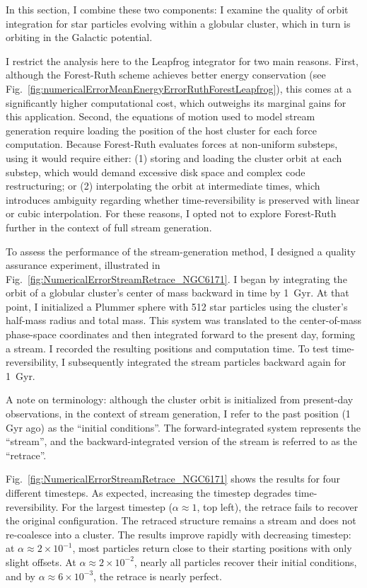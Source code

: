         In this section, I combine these two components: I examine the quality of orbit integration for star particles evolving within a globular cluster, which in turn is orbiting in the Galactic potential.

        I restrict the analysis here to the Leapfrog integrator for two main reasons. First, although the Forest-Ruth scheme achieves better energy conservation (see Fig.~\ref{fig:numericalErrorMeanEnergyErrorRuthForestLeapfrog}), this comes at a significantly higher computational cost, which outweighs its marginal gains for this application. Second, the equations of motion used to model stream generation require loading the position of the host cluster for each force computation. Because Forest-Ruth evaluates forces at non-uniform substeps, using it would require either: (1) storing and loading the cluster orbit at each substep, which would demand excessive disk space and complex code restructuring; or (2) interpolating the orbit at intermediate times, which introduces ambiguity regarding whether time-reversibility is preserved with linear or cubic interpolation. For these reasons, I opted not to explore Forest-Ruth further in the context of full stream generation.

        To assess the performance of the stream-generation method, I designed a quality assurance experiment, illustrated in Fig.~\ref{fig:NumericalErrorStreamRetrace_NGC6171}. I began by integrating the orbit of a globular cluster's center of mass backward in time by 1~Gyr. At that point, I initialized a Plummer sphere with 512 star particles using the cluster's half-mass radius and total mass. This system was translated to the center-of-mass phase-space coordinates and then integrated forward to the present day, forming a stream. I recorded the resulting positions and computation time. To test time-reversibility, I subsequently integrated the stream particles backward again for 1~Gyr.

        A note on terminology: although the cluster orbit is initialized from present-day observations, in the context of stream generation, I refer to the past position (1 Gyr ago) as the ``initial conditions''. The forward-integrated system represents the ``stream'', and the backward-integrated version of the stream is referred to as the ``retrace''.

        Fig.~\ref{fig:NumericalErrorStreamRetrace_NGC6171} shows the results for four different timesteps. As expected, increasing the timestep degrades time-reversibility. For the largest timestep ($\alpha \approx 1$, top left), the retrace fails to recover the original configuration. The retraced structure remains a stream and does not re-coalesce into a cluster. The results improve rapidly with decreasing timestep: at $\alpha \approx 2 \times 10^{-1}$, most particles return close to their starting positions with only slight offsets. At $\alpha \approx 2 \times 10^{-2}$, nearly all particles recover their initial conditions, and by $\alpha \approx 6 \times 10^{-3}$, the retrace is nearly perfect.

